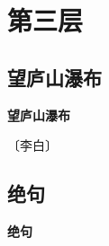\documentclass[12pt,UTF-8,openany,fontset=none]{ctexbook}
\begin{document}
\vspace{8pt}
\clearpage

\chapter{第三层}
\clearpage

\section{望庐山瀑布}



\begin{center}
    {\bfseries 望庐山瀑布}
\end{center}

\begin{center}
    \vspace{10pt}
    
    \begin{large}
        
        〔李白〕
        
    \end{large}
    
    \vspace{8pt}
    
    \begin{huge}
        
        \phantom{。}

        \phantom{。}
        
        \phantom{。}

        \phantom{。}
        
    \end{huge}
    
\end{center}

\vspace{8pt}
\clearpage


\section{绝句}



\begin{center}
    {\bfseries 绝句}
\end{center}
\end{document}
